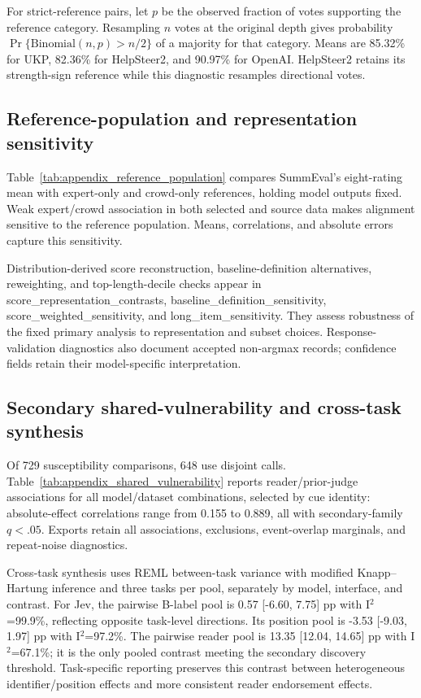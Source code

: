 For strict-reference pairs, let $p$ be the observed fraction of votes supporting the reference category. Resampling $n$ votes at the original depth gives probability $\Pr\{\mathrm{Binomial}(n,p)>n/2\}$ of a majority for that category. Means are 85.32\% for UKP, 82.36\% for HelpSteer2, and 90.97\% for OpenAI. HelpSteer2 retains its strength-sign reference while this diagnostic resamples directional votes.

\subsection{Reference-population and representation sensitivity}

\label{app:results_reference}

Table~\ref{tab:appendix_reference_population} compares SummEval's eight-rating mean with expert-only and crowd-only references, holding model outputs fixed. Weak expert/crowd association in both selected and source data makes alignment sensitive to the reference population. Means, correlations, and absolute errors capture this sensitivity.

Distribution-derived score reconstruction, baseline-definition alternatives, reweighting, and top-length-decile checks appear in score\_representation\_contrasts, baseline\_definition\_sensitivity, score\_weighted\_sensitivity, and long\_item\_sensitivity. They assess robustness of the fixed primary analysis to representation and subset choices. Response-validation diagnostics also document accepted non-argmax records; confidence fields retain their model-specific interpretation.

\subsection{Secondary shared-vulnerability and cross-task synthesis}

\label{app:results_synthesis}

Of 729 susceptibility comparisons, 648 use disjoint calls. Table~\ref{tab:appendix_shared_vulnerability} reports reader/prior-judge associations for all model/dataset combinations, selected by cue identity: absolute-effect correlations range from 0.155 to 0.889, all with secondary-family $q<.05$. Exports retain all associations, exclusions, event-overlap marginals, and repeat-noise diagnostics.

Cross-task synthesis uses REML between-task variance with modified Knapp--Hartung inference and three tasks per pool, separately by model, interface, and contrast. For Jev, the pairwise B-label pool is 0.57 [-6.60, 7.75] pp with I$^2$=99.9\%, reflecting opposite task-level directions. Its position pool is -3.53 [-9.03, 1.97] pp with I$^2$=97.2\%. The pairwise reader pool is 13.35 [12.04, 14.65] pp with I$^2$=67.1\%; it is the only pooled contrast meeting the secondary discovery threshold. Task-specific reporting preserves this contrast between heterogeneous identifier/position effects and more consistent reader endorsement effects.


